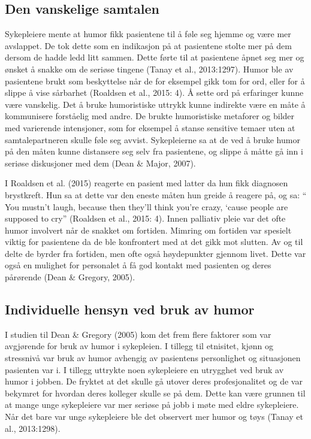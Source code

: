 \subsection{Den vanskelige samtalen}

Sykepleiere mente at humor fikk pasientene til å føle seg hjemme og være mer
avslappet. De tok dette som en indikasjon på at pasientene stolte mer på dem
dersom de hadde ledd litt sammen. Dette førte til at pasientene åpnet seg mer
og ønsket å snakke om de seriøse tingene (Tanay et al., 2013:1297).  Humor ble
av pasientene brukt som beskyttelse når de for eksempel gikk tom for ord, eller
for å slippe å vise sårbarhet (Roaldsen et al., 2015: 4). Å sette ord på
erfaringer kunne være vanskelig. Det å bruke humoristiske uttrykk kunne
indirekte være en måte å kommunisere forståelig med andre. De brukte
humoristiske metaforer og bilder med varierende intensjoner, som for eksempel å
stanse sensitive temaer uten at samtalepartneren skulle føle seg avvist.
Sykepleierne sa at de ved å bruke humor på den måten kunne distansere seg selv
fra pasientene, og slippe å måtte gå inn i seriøse diskusjoner med dem (Dean \&
Major, 2007).

I Roaldsen et al. (2015) reagerte en pasient med latter da hun fikk diagnosen
brystkreft. Hun sa at dette var den eneste måten hun greide å reagere på, og
sa: “ You mustn’t laugh, because then they’ll think you’re crazy, ‘cause people
are supposed to cry” (Roaldsen et al., 2015: 4).  Innen palliativ pleie var det
ofte humor involvert når de snakket om fortiden. Mimring om fortiden var
spesielt viktig for pasientene da de ble konfrontert med at det gikk mot
slutten. Av og til delte de byrder fra fortiden, men ofte også høydepunkter
gjennom livet. Dette var også en mulighet for personalet å få god kontakt med
pasienten og deres pårørende (Dean \&{} Gregory, 2005).

\subsection{Individuelle hensyn ved bruk av humor}

I studien til Dean \&{} Gregory (2005) kom det frem flere faktorer som var
avgjørende for bruk av humor i sykepleien. I tillegg til etnisitet, kjønn og
stressnivå  var bruk av humor avhengig av pasientens personlighet og
situasjonen pasienten var i. I tillegg uttrykte noen sykepleiere en utrygghet
ved bruk av humor i jobben. De fryktet at det skulle gå utover deres
profesjonalitet og de var bekymret for hvordan deres kolleger skulle se på dem.
Dette kan være grunnen til at mange unge sykepleiere var mer seriøse på jobb i
møte med eldre sykepleiere. Når det bare var unge sykepleiere ble det observert
mer humor og tøys (Tanay et al., 2013:1298).

